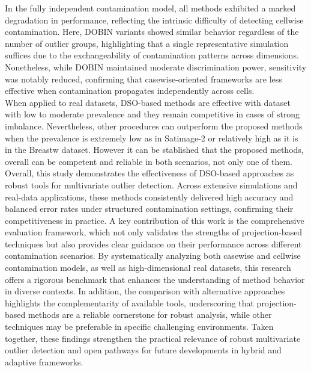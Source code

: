 \documentclass[12pt]{article}
\begin{document}
In the fully independent contamination model, all methods exhibited a marked degradation in performance, reflecting the intrinsic difficulty of detecting cellwise contamination. Here, DOBIN variants showed similar behavior regardless of the number of outlier groups, highlighting that a single representative simulation suffices due to the exchangeability of contamination patterns across dimensions. Nonetheless, while DOBIN maintained moderate discrimination power, sensitivity was notably reduced, confirming that casewise-oriented frameworks are less effective when contamination propagates independently across cells. \\
 
When applied to real datasets, DSO-based methods are effective with dataset with low to moderate prevalence and they remain competitive in cases of strong imbalance. Nevertheless, other procedures can outperform the proposed methods when the prevalence is extremely low as in Satimage-2 or relatively high as it is in the Breastw dataset. However it can be stablished that the proposed methods, overall can be competent and reliable in both scenarios, not only one of them.\\

Overall, this study demonstrates the effectiveness of DSO-based approaches as robust tools for multivariate outlier detection. Across extensive simulations and real-data applications, these methods consistently delivered high accuracy and balanced error rates under structured contamination settings, confirming their competitiveness in practice. A key contribution of this work is the comprehensive evaluation framework, which not only validates the strengths of projection-based techniques but also provides clear guidance on their performance across different contamination scenarios. By systematically analyzing both casewise and cellwise contamination models, as well as high-dimensional real datasets, this research offers a rigorous benchmark that enhances the understanding of method behavior in diverse contexts. 
In addition, the comparison with alternative approaches highlights the complementarity of available tools, underscoring that projection-based methods are a reliable cornerstone for robust analysis, while other techniques may be preferable in specific challenging environments. Taken together, these findings strengthen the practical relevance of robust multivariate outlier detection and open pathways for future developments in hybrid and adaptive frameworks.





\end{document}
